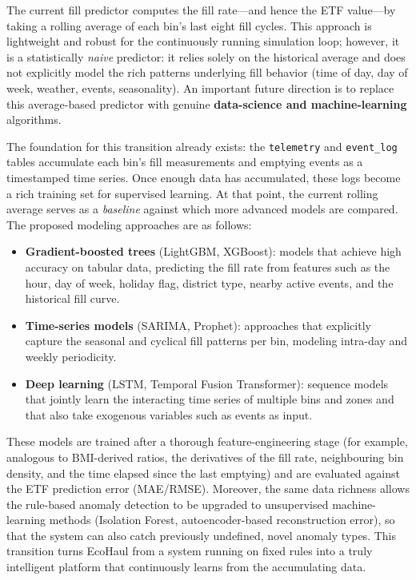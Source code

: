 \documentclass[12pt,a4paper]{report}
\begin{document}
\indent The current fill predictor computes the fill rate---and hence the ETF value---by taking a rolling average of each bin's last eight fill cycles. This approach is lightweight and robust for the continuously running simulation loop; however, it is a statistically \textit{naive} predictor: it relies solely on the historical average and does not explicitly model the rich patterns underlying fill behavior (time of day, day of week, weather, events, seasonality). An important future direction is to replace this average-based predictor with genuine \textbf{data-science and machine-learning} algorithms.

\indent The foundation for this transition already exists: the \texttt{telemetry} and \texttt{event\_log} tables accumulate each bin's fill measurements and emptying events as a timestamped time series. Once enough data has accumulated, these logs become a rich training set for supervised learning. At that point, the current rolling average serves as a \textit{baseline} against which more advanced models are compared. The proposed modeling approaches are as follows:

\begin{itemize}[leftmargin=1.5cm]
  \item \textbf{Gradient-boosted trees} (LightGBM, XGBoost): models that achieve high accuracy on tabular data, predicting the fill rate from features such as the hour, day of week, holiday flag, district type, nearby active events, and the historical fill curve.
  \item \textbf{Time-series models} (SARIMA, Prophet): approaches that explicitly capture the seasonal and cyclical fill patterns per bin, modeling intra-day and weekly periodicity.
  \item \textbf{Deep learning} (LSTM, Temporal Fusion Transformer): sequence models that jointly learn the interacting time series of multiple bins and zones and that also take exogenous variables such as events as input.
\end{itemize}

\indent These models are trained after a thorough feature-engineering stage (for example, analogous to BMI-derived ratios, the derivatives of the fill rate, neighbouring bin density, and the time elapsed since the last emptying) and are evaluated against the ETF prediction error (MAE/RMSE). Moreover, the same data richness allows the rule-based anomaly detection to be upgraded to unsupervised machine-learning methods (Isolation Forest, autoencoder-based reconstruction error), so that the system can also catch previously undefined, novel anomaly types. This transition turns EcoHaul from a system running on fixed rules into a truly intelligent platform that continuously learns from the accumulating data.
\end{document}
